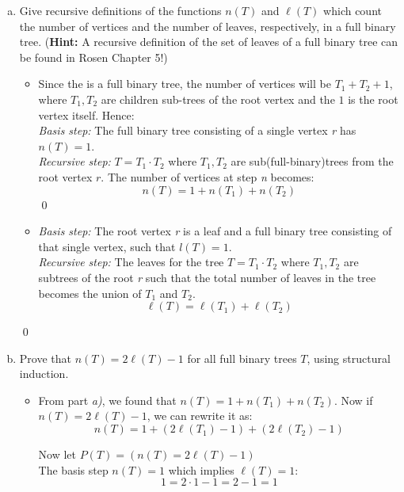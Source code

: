 \documentclass[12pt]{article}
\begin{document}
\begin{enumerate}[a)]
\item Give recursive definitions of the functions $n(T)$ and $\ell(T)$
  which count the number of vertices and the number of leaves,
  respectively, in a full binary tree. (\textbf{Hint:} A recursive
  definition of the set of leaves of a full binary tree can be found
  in Rosen Chapter 5!)
  \medskip

  \begin{itemize}
  \item Since the is a full binary tree, the number of vertices will be $T_1 + T_2 + 1$, where $T_1,T_2$ are children sub-trees of the root vertex and the $1$ is the root vertex itself. Hence: \\

    \textit{Basis step:} The full binary tree consisting of a single vertex \textit{r} has $n(T)=1$. \\
    \textit{Recursive step:} $T = T_1 \cdot T_2$ where $T_1,T_2$ are sub(full-binary)trees from the root vertex $r$.  The number of vertices at step \textit{n} becomes: \\
      $$
  n(T) = 1 + n(T_1) + n(T_2)
  $$
  \qed 
\item
  \textit{Basis step:} The root vertex \textit{r} is a leaf and a full binary tree consisting of that single vertex, such that $l(T) = 1$. \\
  \textit{Recursive step:} The leaves for the tree $T = T_1 \cdot T_2$ where $T_1,T_2$ are subtrees of the root \textit{r} such that the total number of leaves in the tree becomes the union of $T_1$ and $T_2$. \\
  $$
  \ell(T) = \ell(T_1) + \ell(T_2)
  $$ 

  \end{itemize}

\qed
\item  Prove that $n(T)=2\ell(T)-1$ for all full binary trees $T$,
  using structural induction.

  \begin{itemize}
  \item From part \textit{a)}, we found that $n(T) = 1 + n(T_1) + n(T_2)$. Now if $n(T) = 2 \ell(T) -1$, we can rewrite it as: \\
    $$
    n(T) = 1 + (2\ell(T_1) - 1) + (2\ell(T_2) - 1) 
    $$

    Now let $P(T) = (n(T) = 2\ell(T) -1)$ \\ 
    
    The basis step $n(T) = 1$ which implies $\ell(T) = 1$: \\
    $$
    1 =  2\cdot1 - 1 = 2 - 1 = 1
    $$


\end{itemize}
\end{enumerate}
\end{document}
